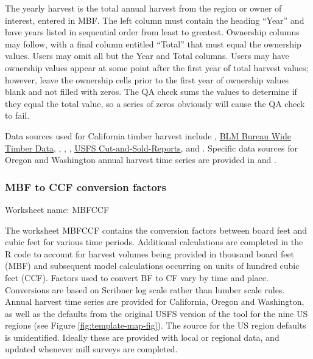 \documentclass[
  openany]{book}
\begin{document}
The yearly harvest is the total annual harvest from the region or owner of interest, entered in MBF. The left column must contain the heading ``Year'' and have years listed in sequential order from least to greatest. Ownership columns may follow, with a final column entitled ``Total'' that must equal the ownership values. Users may omit all but the Year and Total columns. Users may have ownership values appear at some point after the first year of total harvest values; however, leave the ownership cells prior to the first year of ownership values blank and not filled with zeros. The QA check sums the values to determine if they equal the total value, so a series of zeros obviously will cause the QA check to fail.

Data sources used for California timber harvest include \textcite{bolsinger1976}, \href{https://www.blm.gov/programs/natural-resources/forests-and-woodlands/timber-sales/bureau-wide-timber-data}{BLM Bureau Wide Timber Data}, \textcite{morgan2004}, \textcite{morgan2012}, \textcite{mciver2015}, \href{https://www.fs.fed.us/forestmanagement/products/cut-sold/index.shtml}{USFS Cut-and-Sold-Reports}, and \textcite{warren2005}. Specific data sources for Oregon and Washington annual harvest time series are provided in \textcite{morgan2021} and \textcite{nichols2020}.

\hypertarget{own-prov-input-mbfccf}{%
\subsubsection{MBF to CCF conversion factors}\label{own-prov-input-mbfccf}}

Worksheet name: MBFCCF

The worksheet MBFCCF contains the conversion factors between board feet and cubic feet for various time periods. Additional calculations are completed in the R code to account for harvest volumes being provided in thousand board feet (MBF) and subsequent model calculations occurring on units of hundred cubic feet (CCF). Factors used to convert BF to CF vary by time and place. Conversions are based on Scribner log scale rather than lumber scale rules. Annual harvest time series are provided for California, Oregon and Washington, as well as the defaults from the original USFS version of the tool for the nine US regions (see Figure \ref{fig:template-map-fig}). The source for the US region defaults is unidentified. Ideally these are provided with local or regional data, and updated whenever mill surveys are completed.
\end{document}
